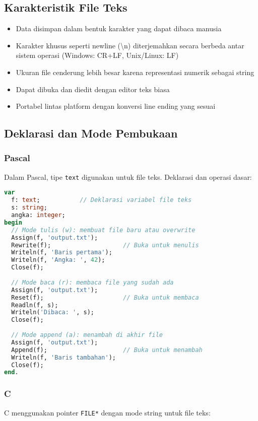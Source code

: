 \documentclass[../main.tex]{subfiles}
\begin{document}
\subsection{Karakteristik File Teks}
\begin{itemize}
  \item Data disimpan dalam bentuk karakter yang dapat dibaca manusia
  \item Karakter khusus seperti newline (\textbackslash n) diterjemahkan secara berbeda antar sistem operasi (Windows: CR+LF, Unix/Linux: LF)
  \item Ukuran file cenderung lebih besar karena representasi numerik sebagai string
  \item Dapat dibuka dan diedit dengan editor teks biasa
  \item Portabel lintas platform dengan konversi line ending yang sesuai
\end{itemize}

\subsection{Deklarasi dan Mode Pembukaan}

\subsubsection{Pascal}
Dalam Pascal, tipe \texttt{text} digunakan untuk file teks. Deklarasi dan operasi dasar:

\begin{lstlisting}[language=Pascal, caption={Deklarasi dan mode file teks Pascal}]
var
  f: text;           // Deklarasi variabel file teks
  s: string;
  angka: integer;
begin
  // Mode tulis (w): membuat file baru atau overwrite
  Assign(f, 'output.txt');
  Rewrite(f);                    // Buka untuk menulis
  Writeln(f, 'Baris pertama');
  Writeln(f, 'Angka: ', 42);
  Close(f);
  
  // Mode baca (r): membaca file yang sudah ada
  Assign(f, 'output.txt');
  Reset(f);                      // Buka untuk membaca
  Readln(f, s);
  Writeln('Dibaca: ', s);
  Close(f);
  
  // Mode append (a): menambah di akhir file
  Assign(f, 'output.txt');
  Append(f);                     // Buka untuk menambah
  Writeln(f, 'Baris tambahan');
  Close(f);
end.
\end{lstlisting}

\subsubsection{C}
C menggunakan pointer \texttt{FILE*} dengan mode string untuk file teks:
\end{document}
